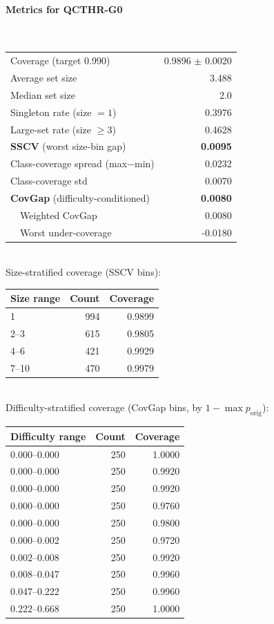 \documentclass[parskip=half]{scrartcl}
\begin{document}
\paragraph{Metrics for QCTHR-G0}~\\
\begin{tabular}{l r}
\hline
Coverage (target 0.990) & 0.9896 $\pm$ 0.0020 \\
Average set size & 3.488 \\
Median set size & 2.0 \\
Singleton rate (size $=1$) & 0.3976 \\
Large-set rate (size $\geq 3$) & 0.4628 \\
\textbf{SSCV} (worst size-bin gap) & \textbf{0.0095} \\
Class-coverage spread (max$-$min) & 0.0232 \\
Class-coverage std & 0.0070 \\
\textbf{CovGap} (difficulty-conditioned) & \textbf{0.0080} \\
~~Weighted CovGap & 0.0080 \\
~~Worst under-coverage & -0.0180 \\
\hline
\end{tabular}\\[0.5em]
\textsf{\scriptsize Size-stratified coverage (SSCV bins):}\\
\begin{tabular}{l r r}
\hline
Size range & Count & Coverage \\
\hline
1 & 994 & 0.9899 \\
2--3 & 615 & 0.9805 \\
4--6 & 421 & 0.9929 \\
7--10 & 470 & 0.9979 \\
\hline
\end{tabular}\\[0.5em]
\textsf{\scriptsize Difficulty-stratified coverage (CovGap bins, by $1-\max p_{\mathrm{orig}}$):}\\
\begin{tabular}{l r r}
\hline
Difficulty range & Count & Coverage \\
\hline
0.000--0.000 & 250 & 1.0000 \\
0.000--0.000 & 250 & 0.9920 \\
0.000--0.000 & 250 & 0.9920 \\
0.000--0.000 & 250 & 0.9760 \\
0.000--0.000 & 250 & 0.9800 \\
0.000--0.002 & 250 & 0.9720 \\
0.002--0.008 & 250 & 0.9920 \\
0.008--0.047 & 250 & 0.9960 \\
0.047--0.222 & 250 & 0.9960 \\
0.222--0.668 & 250 & 1.0000 \\
\hline
\end{tabular}\\[0.5em]
\end{document}
